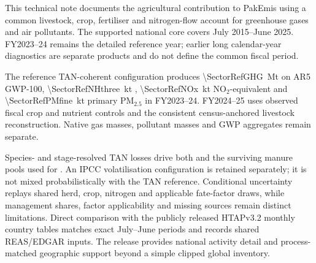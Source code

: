 This technical note documents the agricultural contribution to PakEmis using a common livestock, crop, fertiliser and nitrogen-flow account for greenhouse gases and air pollutants. The supported national core covers July 2015--June 2025. FY2023--24 remains the detailed reference year; earlier long calendar-year diagnostics are separate products and do not define the common fiscal period.

The reference TAN-coherent configuration produces \SI{\SectorRefGHG}{\mega\tonne} \COe{} on AR5 GWP-100, \SI{\SectorRefNHthree}{\kilo\tonne} \NHthree{}, \SI{\SectorRefNOx}{\kilo\tonne} NO$_2$-equivalent \NOx{} and \SI{\SectorRefPMfine}{\kilo\tonne} primary PM$_{2.5}$ in FY2023--24. FY2024--25 uses observed fiscal crop and nutrient controls and the consistent census-anchored livestock reconstruction. Native gas masses, pollutant masses and GWP aggregates remain separate.

Species- and stage-resolved TAN losses drive both \NHthree{} and the surviving manure pools used for \NtwoO{}. An IPCC volatilisation configuration is retained separately; it is not mixed probabilistically with the TAN reference. Conditional uncertainty replays shared herd, crop, nitrogen and applicable fate-factor draws, while management shares, factor applicability and missing sources remain distinct limitations. Direct comparison with the publicly released HTAPv3.2 monthly country tables matches exact July--June periods and records shared REAS/EDGAR inputs. The release provides national activity detail and process-matched geographic support beyond a simple clipped global inventory.
